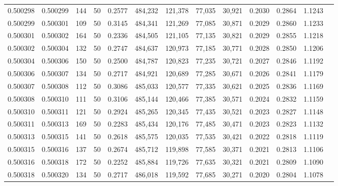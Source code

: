 \begin{tabular}{rrrrrrrrrrrrr}
0.500298 & 0.500299 & 144 &  50 &                                     0.2577 & 484,232 & 121,378 &  77,035 &  30,921 & 0.2030 & 0.2864 & 1.1243 \\
0.500299 & 0.500301 & 109 &  50 &                                     0.3145 & 484,341 & 121,269 &  77,085 &  30,871 & 0.2029 & 0.2860 & 1.1233 \\
0.500301 & 0.500302 & 164 &  50 &                                     0.2336 & 484,505 & 121,105 &  77,135 &  30,821 & 0.2029 & 0.2855 & 1.1218 \\
0.500302 & 0.500304 & 132 &  50 &                                     0.2747 & 484,637 & 120,973 &  77,185 &  30,771 & 0.2028 & 0.2850 & 1.1206 \\
0.500304 & 0.500306 & 150 &  50 &                                     0.2500 & 484,787 & 120,823 &  77,235 &  30,721 & 0.2027 & 0.2846 & 1.1192 \\
0.500306 & 0.500307 & 134 &  50 &                                     0.2717 & 484,921 & 120,689 &  77,285 &  30,671 & 0.2026 & 0.2841 & 1.1179 \\
0.500307 & 0.500308 & 112 &  50 &                                     0.3086 & 485,033 & 120,577 &  77,335 &  30,621 & 0.2025 & 0.2836 & 1.1169 \\
0.500308 & 0.500310 & 111 &  50 &                                     0.3106 & 485,144 & 120,466 &  77,385 &  30,571 & 0.2024 & 0.2832 & 1.1159 \\
0.500310 & 0.500311 & 121 &  50 &                                     0.2924 & 485,265 & 120,345 &  77,435 &  30,521 & 0.2023 & 0.2827 & 1.1148 \\
0.500311 & 0.500313 & 169 &  50 &                                     0.2283 & 485,434 & 120,176 &  77,485 &  30,471 & 0.2023 & 0.2823 & 1.1132 \\
0.500313 & 0.500315 & 141 &  50 &                                     0.2618 & 485,575 & 120,035 &  77,535 &  30,421 & 0.2022 & 0.2818 & 1.1119 \\
0.500315 & 0.500316 & 137 &  50 &                                     0.2674 & 485,712 & 119,898 &  77,585 &  30,371 & 0.2021 & 0.2813 & 1.1106 \\
0.500316 & 0.500318 & 172 &  50 &                                     0.2252 & 485,884 & 119,726 &  77,635 &  30,321 & 0.2021 & 0.2809 & 1.1090 \\
0.500318 & 0.500320 & 134 &  50 &                                     0.2717 & 486,018 & 119,592 &  77,685 &  30,271 & 0.2020 & 0.2804 & 1.1078 \\

\end{tabular}
